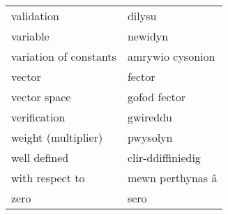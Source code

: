 \begin{supertabular}{p{0.22\textwidth}p{0.22\textwidth}}
validation & dilysu \\
variable & newidyn \\
variation of constants & amrywio cysonion \\
vector & fector \\
vector space & gofod fector \\
verification & gwireddu \\
weight (multiplier) & pwysolyn \\
well defined & clir-ddiffiniedig \\
with respect to & mewn perthynas â \\
zero & sero \\
\end{supertabular}
